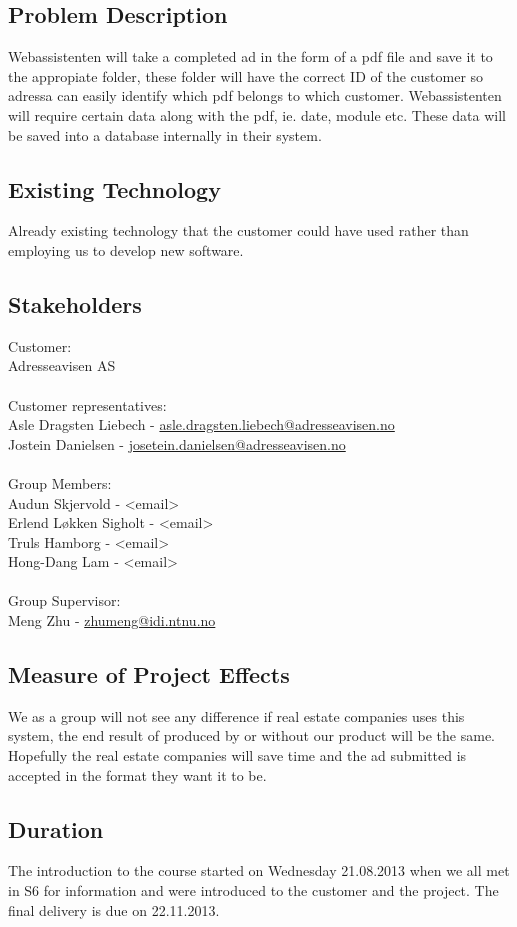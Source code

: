 \subsection{Problem Description}
Webassistenten will take a completed ad in the form of a pdf file and save it to the appropiate folder, these folder will have the correct ID of the customer so adressa can easily identify which pdf belongs to which customer.
Webassistenten will require certain data along with the pdf, ie. date, module etc. These data will be saved into a database internally in their system.

\subsection{Existing Technology}
Already existing technology that the customer could have used rather than employing us to develop new software.

\subsection{Stakeholders}
Customer:\\
Adresseavisen AS\\
\\
Customer representatives:\\
Asle Dragsten Liebech - \href{mailto://asle.dragsten.liebech@adresseavisen.no}{asle.dragsten.liebech@adresseavisen.no}\\
Jostein Danielsen - \href{mailto://josetein.danielsen@adresseavisen.no}{josetein.danielsen@adresseavisen.no}\\
\\
Group Members:\\
Audun Skjervold - <email>\\
Erlend Løkken Sigholt - <email>\\
Truls Hamborg - <email>\\
Hong-Dang Lam - <email>\\
\\
Group Supervisor:\\
Meng Zhu - \href{mailto://zhumeng@idi.ntnu.no}{zhumeng@idi.ntnu.no}
\\
\subsection{Measure of Project Effects}
We as a group will not see any difference if real estate companies uses this system, the end result of produced by or without our product will be the same. Hopefully the real estate companies will save time and the ad submitted is accepted in the format they want it to be.
\subsection{Duration}
The introduction to the course started on Wednesday 21.08.2013 when we all met in S6 for information and were introduced to the customer and the project.
The final delivery is due on 22.11.2013.